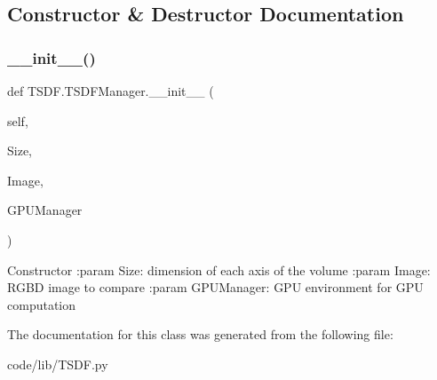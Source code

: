 \subsection{Constructor \& Destructor Documentation}
\mbox{\label{class_t_s_d_f_1_1_t_s_d_f_manager_aa12aee58f9d79032e2ff5256a1eaba35}} 
\subsubsection{\texorpdfstring{\+\_\+\+\_\+init\+\_\+\+\_\+()}{\_\_init\_\_()}}
{\footnotesize\ttfamily def T\+S\+D\+F.\+T\+S\+D\+F\+Manager.\+\_\+\+\_\+init\+\_\+\+\_\+ (\begin{DoxyParamCaption}\item[{}]{self,  }\item[{}]{Size,  }\item[{}]{Image,  }\item[{}]{G\+P\+U\+Manager }\end{DoxyParamCaption})}

\begin{DoxyVerb}Constructor
:param Size: dimension of each axis of the volume
:param Image: RGBD image to compare
:param GPUManager: GPU environment for GPU computation
\end{DoxyVerb}
 

The documentation for this class was generated from the following file\+:\begin{DoxyCompactItemize}
\item 
code/lib/T\+S\+D\+F.\+py\end{DoxyCompactItemize}
